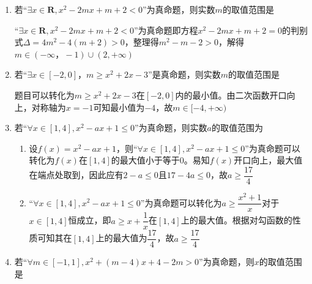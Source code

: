 \begin{enumerate}
\begin{enumerate}
        \begin{jieda}
            “$\forall x \in \mathbf{R}, x^2 + 3ax+ 9 > 0$”是真命题，即方程$x^2 + 3ax + 9 = 0$的判别式$\Delta = 9a^2 - 36 < 0$，解得$a \in (-2, 2)$\\
            “$\exists x \in \mathbf{R}, x^2 + 2x + a < 0$”是真命题，即方程$x^2 + 2x + a = 0$的判别式$\Delta = 4 - 4a > 0$，解得$a \in (-\infty, 1)$ \\
            两者求交集，得到$a \in (-2, 1)$
        \end{jieda}
        \item 若“$\exists x \in \mathbf{R}, x^2 - 2mx + m + 2 < 0$”为真命题，则实数$m$的取值范围是
        \begin{jieda}
            “$\exists x \in \mathbf{R}, x^2 - 2mx + m + 2 < 0$”为真命题即方程$x^2 - 2mx + m + 2 = 0$的判别式$\Delta = 4m^2 - 4(m+2) > 0$，整理得$m^2 - m - 2 > 0$，解得$m \in (-\infty， -1) \cup (2, +\infty)$
        \end{jieda}
        \item 若“$\exists x \in [-2, 0]$，$m \geq x^2 +2x -3$”是真命题，则实数$m$的取值范围是\blkda{$[-4, +\infty)$}
        \begin{jieda}
            题目可以转化为$m \geq x^2 +2x -3$在$[-2, 0]$内的最小值。由二次函数开口向上，对称轴为$x = -1$可知最小值为$-4$，故$m \in [-4, +\infty)$
        \end{jieda}
        \item 若“$\forall x \in [1, 4], x^2 -ax + 1 \leq 0$”为真命题，则实数$a$的取值范围为\blkda{$\left[\dfrac{17}{4}, +\infty \right)$}
        \begin{jieda}
            \begin{enumerate}
                \item 设$f(x) = x^2 -ax + 1$，则“$\forall x \in [1, 4], x^2 -ax + 1 \leq 0$”为真命题可以转化为$f(x)$在$[1, 4]$的最大值小于等于0。易知$f(x)$开口向上，最大值在端点处取到，因此应有$2 - a \leq 0$且$17 - 4a \leq 0$，故$a \geq \dfrac{17}{4}$
                \item “$\forall x \in [1, 4], x^2 -ax + 1 \leq 0$”为真命题可以转化为$a \geq \dfrac{x^2+1}{x}$对于$x \in [1, 4]$恒成立，即$a \geq x + \dfrac{1}{x}$在$[1, 4]$上的最大值。根据对勾函数的性质可知其在$[1, 4]$上的最大值为$\dfrac{17}{4}$，故$a \geq \dfrac{17}{4}$
            \end{enumerate}
        \end{jieda}        
        \item 若“$\forall m \in [-1, 1], x^2 + (m-4)x + 4 - 2m > 0$”为真命题，则$x$的取值范围是

\end{enumerate}
\end{enumerate}
